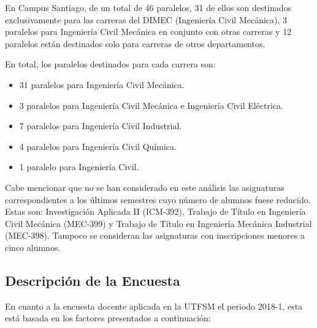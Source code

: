 \documentclass[12pt]{article}
\begin{document}
\vspace{10mm}
\begin{text}
\indent
En Campus Santiago, de un total de 46 paralelos, 31 de ellos son destinados exclusivamente para las carreras del DIMEC (Ingeniería Civil Mecánica), 3 paralelos para Ingeniería Civil Mecánica en conjunto con otras carreras y 12 paralelos están destinados solo para carreras de otros departamentos.\par
En total, los paralelos destinados para cada carrera son:
\end{text}
\begin{itemize}
    \item 31 paralelos para Ingeniería Civil Mecánica.
    \item 3 paralelos para Ingeniería Civil Mecánica e Ingeniería Civil Eléctrica.
    \item 7 paralelos para Ingeniería Civil Industrial.
    \item 4 paralelos para Ingeniería Civil Química. 
    \item 1 paralelo para Ingeniería Civil.
\end{itemize}
\begin{text}
\indent
Cabe mencionar que no se han considerado en este análisis las asignaturas correspondientes a los últimos semestres cuyo número de alumnos fuese reducido. Estas son: Investigación Aplicada II (ICM-392), Trabajo de Título en Ingeniería Civil Mecánica (MEC-399) y Trabajo de Título en Ingeniería Mecánica Industrial (MEC-398). Tampoco se consideran las asignaturas con inscripciones menores a cinco alumnos.
\end{text}


\subsection{Descripción de la Encuesta} \label{2.2}
\begin{text}
En cuanto a la encuesta docente aplicada en la UTFSM el periodo 2018-1, esta está basada en los factores presentados a continuación:
\end{text}
\end{document}
